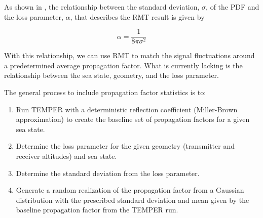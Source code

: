 As shown in \cite{yeh_fading}, the relationship between the standard deviation, $\sigma$, of the PDF and the loss parameter, $\alpha$, that describes the RMT result is given by

\begin{equation}
\alpha = \frac{1}{8\pi\sigma^2}
\end{equation}
\renewcommand{\baselinestretch}{2} \small\normalsize

With this relationship, we can use RMT to match the signal fluctuations around a predetermined average propagation factor. What is currently lacking is the relationship between the sea state, geometry, and the loss parameter.

The general process to include propagation factor statistics is to:
\begin{enumerate}
\item Run TEMPER with a deterministic reflection coefficient (Miller-Brown approximation) to create the baseline set of propagation factors for a given sea state.
\item Determine the loss parameter for the given geometry (transmitter and receiver altitudes) and sea state.
\item Determine the standard deviation from the loss parameter.
\item Generate a random realization of the propagation factor from a Gaussian distribution with the prescribed standard deviation and mean given by the baseline propagation factor from the TEMPER run.
\end{enumerate}